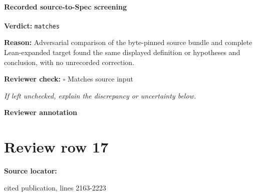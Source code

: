 \documentclass[10pt]{article}
\newcommand{\reviewerbox}{%
  \par\noindent\fbox{\parbox{0.96\linewidth}{\rule{0pt}{0.38in}}}\par
}
\newcommand{\reviewmatch}[1]{%
  \par\noindent\textbf{Reviewer check:} $\square$\; #1\par
  \noindent\emph{If left unchecked, explain the discrepancy or uncertainty below.}\par
}
\begin{document}
\paragraph{Recorded source-to-Spec screening}
\textbf{Verdict:} \texttt{matches}
\\
{\raggedright
\textbf{Reason:} Adversarial comparison of the byte-\allowbreak{}pinned source bundle and complete Lean-\allowbreak{}expanded target found the same displayed definition or hypotheses and conclusion, with no unrecorded correction.\allowbreak{}
\par}
\reviewmatch{Matches source input}
\noindent\textbf{Reviewer annotation}\par
\reviewerbox
\clearpage
\hypertarget{source-claim-d95b8ab740a8ceda}{}
\section*{Review row 17}
\textbf{Source locator:} {\footnotesize\raggedright cited publication, lines 2163-\allowbreak{}2223\par}
\end{document}
